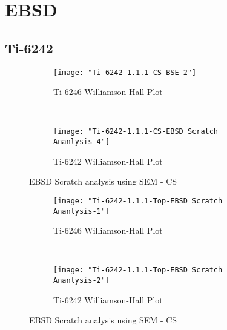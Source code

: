 \newpage
\renewcommand{\workingDate}{\textsc{2017 $|$ September $|$ 22}}
\section{EBSD}
\subsection{Ti-6242}

\begin{figure}[H]
    \centering
    \begin{subfigure}{0.49\textwidth}
        \texttt{[image: "Ti-6242-1.1.1-CS-BSE-2"]}
        \caption{Ti-6246 Williamson-Hall Plot}
        \label{fig:Ti-6242 Williamson-Hall Plot}
    \end{subfigure}
    ~
    \begin{subfigure}{0.49\textwidth}
        \texttt{[image: "Ti-6242-1.1.1-CS-EBSD Scratch Ananlysis-4"]}
        \caption{Ti-6242 Williamson-Hall Plot}
        \label{fig:Ti-6242 Williamson-Hall Plot}
    \end{subfigure}
  
    \caption{EBSD Scratch analysis using SEM - CS}
    \label{fig:EBSD Scratch analysis using SEM - CS}
\end{figure}

\begin{figure}[H]
    \centering
    \begin{subfigure}{0.49\textwidth}
        \texttt{[image: "Ti-6242-1.1.1-Top-EBSD Scratch Ananlysis-1"]}
        \caption{Ti-6246 Williamson-Hall Plot}
        \label{fig:Ti-6242 Williamson-Hall Plot}
    \end{subfigure}
    ~
    \begin{subfigure}{0.49\textwidth}
        \texttt{[image: "Ti-6242-1.1.1-Top-EBSD Scratch Ananlysis-2"]}
        \caption{Ti-6242 Williamson-Hall Plot}
        \label{fig:Ti-6242 Williamson-Hall Plot}
    \end{subfigure}
  
    \caption{EBSD Scratch analysis using SEM - CS}
    \label{fig:EBSD Scratch analysis using SEM - Top}
\end{figure}